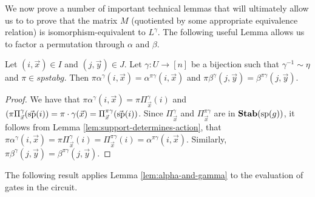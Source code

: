 \documentclass[../paper.tex]{subfiles}
\begin{document}



We now prove a number of important technical lemmas that will ultimately allow
us to to prove that the matrix $M$ (quotiented by some appropriate equivalence
relation) is isomorphism-equivalent to $L^{\gamma}$. The following useful Lemma
allows us to factor a permutation through $\alpha$ and $\beta$.

\begin{lem}
  \label{lem:alpha-and-gamma}
  Let $(i,\vec{x}) \in I$ and $(j, \vec{y}) \in J$. Let $\gamma: U \rightarrow
  [n]$ be a bijection such that $\gamma^{-1} \sim \eta$ and $\pi \in spstab{g}$.
  Then $\pi \alpha^{\gamma}(i, \vec{x}) = \alpha^{\pi \gamma}(i, \vec{x})$ and
  $\pi \beta^{\gamma}(j, \vec{y}) = \beta^{\pi \gamma}(j, \vec{y})$.
\end{lem}
\begin{proof}
  We have that $\pi \alpha^{\gamma}(i, \vec{x}) = \pi \Pi^{\gamma}_{\vec{x}}(i)$
  and $(\pi \Pi^{\gamma}_{\vec{x}}(\vec{\text{sp}}(i)) = \pi \cdot \gamma (\vec{x})
  = \Pi^{\pi \gamma}_{\vec{x}}(\vec{\text{sp}}(i))$. Since $\Pi^{\gamma}_{\vec{x}}$
  and $\Pi^{\pi \gamma}_{\vec{x}}$ are in $\text{\textbf{Stab}} (\text{sp} (g))$, it follows from Lemma
  \ref{lem:support-determines-action}, that $\pi \alpha^{\gamma}(i, \vec{x}) =
  \pi \Pi^{\gamma}_{\vec{x}} (i) = \Pi^{\pi \gamma}_{\vec{x}}(i) = \alpha^{\pi
    \gamma}(i, \vec{x})$. Similarly, $\pi \beta^{\gamma}(j, \vec{y}) =
  \beta^{\pi \gamma} (j, \vec{y})$.
\end{proof}

The following result applies Lemma \ref{lem:alpha-and-gamma} to the evaluation
of gates in the circuit.
\end{document}
